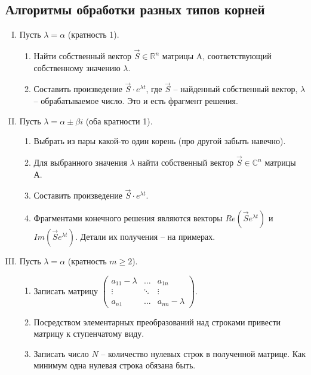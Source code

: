 \documentclass[10pt, a4paper]{article}
\begin{document}
\subsection{Алгоритмы обработки разных типов корней}
\begin{enumerate}[I.]
    \item Пусть $\lambda = \alpha$ (кратность 1).
        \begin{enumerate}
            \item Найти собственный вектор $\Vec{S} \in \mathbb{R}^n$ матрицы A, соответствующий собственному значению $\lambda$.
            \item Составить произведение $\Vec{S} \cdot e^{\lambda t}$, где $\Vec{S}$ -- найденный собственный вектор, $\lambda$ -- обрабатываемое число. Это и есть фрагмент решения.
        \end{enumerate}
    \item Пусть $\lambda = \alpha \pm \beta i$ (оба кратности 1).
        \begin{enumerate}
            \item Выбрать из пары какой-то один корень (про другой забыть навечно).
            \item Для выбранного значения $\lambda$ найти собственный вектор $\Vec{S} \in \mathbb{C}^{n}$ матрицы А.
            \item Составить произведение $\Vec{S} \cdot e^{\lambda t}$.
            \item Фрагментами конечного решения являются векторы $Re(\Vec{S}e^{\lambda t})$ и $Im(\Vec{S}e^{\lambda t})$. Детали их получения -- на примерах.
        \end{enumerate}
    \item Пусть $\lambda = \alpha$ (кратность $m \geq 2$).
        \begin{enumerate}
            \item Записать матрицу
                $
                    \begin{pmatrix}
                        a_{11} - \lambda & \ldots & a_{1n} \\
                        \vdots           & \ddots & \vdots \\
                        a_{n1}           & \ldots & a_{nn} - \lambda
                    \end{pmatrix}
                $.
            \item Посредством элементарных преобразований над строками привести матрицу к ступенчатому виду.
            \item Записать число $N$ -- количество нулевых строк в полученной матрице. Как минимум одна нулевая строка обязана быть.

\end{enumerate}
\end{enumerate}
\end{document}
